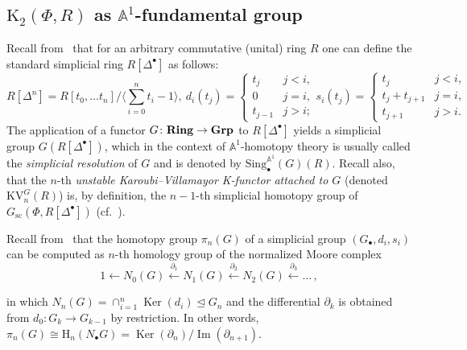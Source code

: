 \documentclass[oneside, 11pt]{amsart} \pdfoutput=1
\renewcommand{\Im}{\mathop{\mathrm{Im}}\nolimits}
\newcommand{\Ker}{\mathop{\mathrm{Ker}}\nolimits}
\newcommand{\K}{{\mathrm{K}}}
\numberwithin{equation}{section}
\theoremstyle{definition}
\newcommand{\catname}[1]{{\normalfont\textbf{#1}}} %
\begin{document}
\subsection{\texorpdfstring{$\K_2(\Phi, R)$}{K2(R)} as $\mathbb{A}^1$-fundamental group}
Recall from~\cite{Jar83} that for an arbitrary commutative (unital) ring $R$ one can define the standard simplicial ring $R[\Delta^\bullet]$ as follows:
\begin{equation}
 R[\Delta^n] = R[t_0,\ldots t_n]/\langle \sum_{i=0}^n t_i -1 \rangle,\ d_i(t_j) = \left\{ \begin{array}{ll}t_j & j < i, \\0 & j = i, \\ t_{j-1} & j > i; \end{array}\right. s_i(t_j) = \left\{ \begin{array}{ll} t_j & j < i, \\ t_j + t_{j+1} & j = i, \\ t_{j+1} & j > i. \end{array} \right.
\end{equation}
	The application of a functor $G\colon\catname{Ring}\rightarrow\catname{Grp}$ to $R[\Delta^\bullet]$ yields a simplicial group $G(R[\Delta^\bullet])$, which in the context of $\mathbb{A}^1$-homotopy theory is usually called the {\it simplicial resolution} of $G$ and is denoted by $\mathrm{Sing}^{\mathbb{A}^1}_\bullet(G)(R)$. Recall also, that the $n$-th {\it unstable Karoubi--Villamayor K-functor attached to $G$} (denoted $\mathrm{KV}^G_n(R)$) is, by definition, the $n-1$-th simplicial homotopy group of $G_\mathrm{sc}(\Phi, R[\Delta^\bullet])$ (cf.~\cite[\S~4.3]{AHW18}).

Recall from~\cite[\S~17]{May67} that the homotopy group $\pi_n(G)$ of a simplicial group $(G_\bullet, d_i, s_i)$ can be computed as $n$-th homology group of the normalized Moore complex
\[
1 \leftarrow N_0(G) \xleftarrow{\partial_1} N_1(G) \xleftarrow{\partial_2} N_2(G) \xleftarrow{\partial_3} \ldots\,,
\]
\iffalse\[\begin{tikzcd} 1 & N_0(G) \ar[l] & N_1(G) \ar{l}[swap]{\partial_1} & N_2(G) \ar{l}[swap]{\partial_2} & \ar{l}[swap]{\partial_3} \ldots, \end{tikzcd} \] \fi
in which $N_n(G) = \cap_{i=1}^n\Ker(d_i) \trianglelefteq G_n$ and the differential $\partial_k$ is obtained from $d_0\colon G_k \to G_{k-1}$ by restriction. In other words, $\pi_n(G) \cong \mathrm{H}_n(N_\bullet G) = \Ker(\partial_n) / \Im(\partial_{n+1})$.
\end{document}
